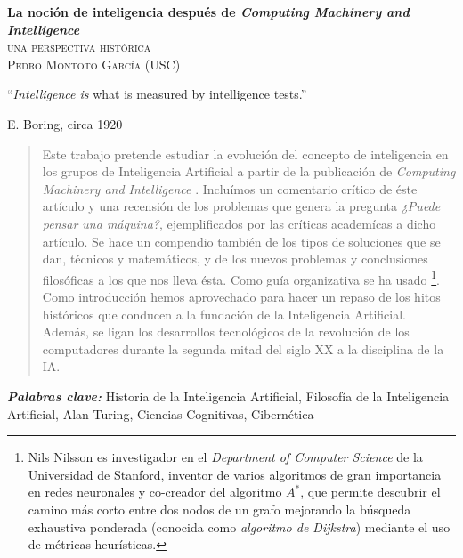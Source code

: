 \documentclass[12pt]{memoir}
\makeatletter
\newlength\drop
\newcommand*\titleM{\begingroup%
\setlength\drop{0.08\textheight}
\centering
\vspace*{\drop}
{\Huge\bfseries La noción de inteligencia después de \textit{Computing Machinery and Intelligence}}\\[\baselineskip]
{\scshape una perspectiva histórica}\\[\baselineskip]
\vfill
{\large\scshape Pedro Montoto García (USC)}\par
\vfill
{\scshape \@date}\par
\vspace*{2\drop}
\endgroup}
\providecommand{\keywords}[2]{
	\textbf{\textit{#1: }} #2
}
\makeatother
\begin{document}
\pagestyle{empty}




\begin{titlingpage}
\titleM
\end{titlingpage}

\OnehalfSpacing



\setlength{\epigraphwidth}{0.8\textwidth}
\thispagestyle{empty}
\epigraph{``\textit{Intelligence is} what is measured by intelligence tests.''}{E. Boring, circa 1920}
\newpage


\thispagestyle{empty}
\begin{abstract}
	Este trabajo pretende estudiar la evolución del concepto de inteligencia en los grupos de Inteligencia Artificial a partir de la publicación de \textit{Computing Machinery and Intelligence} \parencite{Turing1950cmi}. Incluímos un comentario crítico de éste artículo y una recensión de los problemas que genera la pregunta \textit{¿Puede pensar una máquina?}, ejemplificados por las críticas academícas a dicho artículo. Se hace un compendio también de los tipos de soluciones que se dan, técnicos y matemáticos, y de los nuevos problemas y conclusiones filosóficas a los que nos lleva ésta. Como guía organizativa se ha usado  \parencite{Nilsson2009}\footnote{Nils Nilsson es investigador en el \textit{Department of Computer Science} de la Universidad de Stanford, inventor de varios algoritmos de gran importancia en redes neuronales y co-creador del algoritmo $A^*$, que permite descubrir el camino más corto entre dos nodos de un grafo mejorando la búsqueda exhaustiva ponderada (conocida como \textit{algoritmo de Dijkstra}) mediante el uso de métricas heurísticas.}. Como introducción hemos aprovechado para hacer un repaso de los hitos históricos que conducen a la fundación de la Inteligencia Artificial. Además, se ligan los desarrollos tecnológicos de la revolución de los computadores durante la segunda mitad del siglo XX a la disciplina de la IA.
\end{abstract}

\keywords{Palabras clave}{Historia de la Inteligencia Artificial, Filosofía de la Inteligencia Artificial, Alan Turing, Ciencias Cognitivas, Cibernética}
\end{document}
